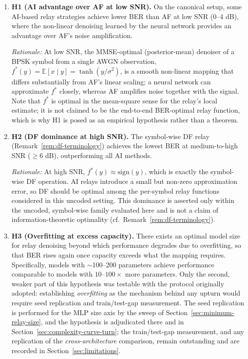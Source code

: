 \begin{enumerate}
    \item \textbf{H1 (AI advantage over AF at low SNR).} On the canonical setup, some AI-based relay strategies achieve lower BER than AF at low SNR (0--4 dB), where the non-linear denoising learned by the neural network provides an advantage over AF's noise amplification.

\emph{Rationale:} At low SNR, the MMSE-optimal (posterior-mean) denoiser of a BPSK symbol from a single AWGN observation, $f^*(y) = \mathbb{E}[x \mid y] = \tanh(y/\sigma^2)$, is a smooth non-linear mapping that differs substantially from AF's linear scaling; a neural network can approximate $f^*$ closely, whereas AF amplifies noise together with the signal. Note that $f^*$ is optimal in the mean-square sense for the relay's local estimate; it is not claimed to be the end-to-end BER-optimal relay function, which is why H1 is posed as an empirical hypothesis rather than a theorem.

\item \textbf{H2 (DF dominance at high SNR).} The symbol-wise DF relay (Remark~\ref{rem:df-terminology}) achieves the lowest BER at medium-to-high SNR ($\geq 6$ dB), outperforming all AI methods.

\emph{Rationale:} At high SNR, $f^*(y) \approx \text{sign}(y)$, which is exactly the symbol-wise DF operation. AI relays introduce a small but non-zero approximation error, so DF should be optimal among the per-symbol relay functions considered in this uncoded setting. This dominance is asserted only within the uncoded, symbol-wise family evaluated here and is not a claim of information-theoretic optimality (cf.\ Remark~\ref{rem:df-terminology}).

\item \textbf{H3 (Overfitting at excess capacity).} There exists an optimal model size for relay denoising beyond which performance degrades due to overfitting, so that BER rises again once capacity exceeds what the mapping requires. Specifically, models with $\sim$100--200 parameters achieve performance comparable to models with $10$--$100\times$ more parameters. Only the second, weaker part of this hypothesis was testable with the protocol originally adopted: establishing \emph{overfitting} as the mechanism behind any upturn would require seed replication and train/test-gap measurement. The seed replication is performed for the MLP size axis by the sweep of Section~\ref{sec:minimum-relay-size}, and the hypothesis is adjudicated there and in Section~\ref{sec:complexity-curve-turn}; the train/test-gap measurement, and any replication of the \emph{cross-architecture} comparison, remain outstanding and are recorded in Section~\ref{sec:limitations}.


\end{enumerate}
